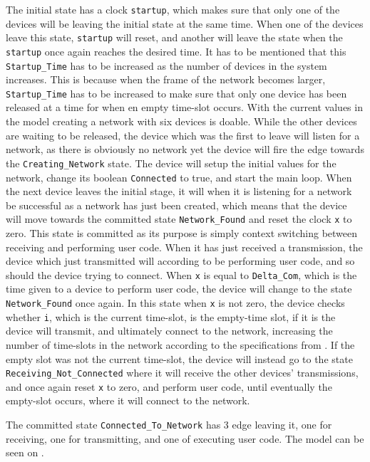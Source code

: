 The initial state has a clock \texttt{startup}, which makes sure that only one of the devices will be leaving the initial state at the same time.
When one of the devices leave this state, \texttt{startup} will reset, and another will leave the state when the \texttt{startup} once again reaches the desired time.
It has to be mentioned that this \texttt{Startup\_Time} has to be increased as the number of devices in the system increases.
This is because when the frame of the network becomes larger, \texttt{Startup\_Time} has to be increased to make sure that only one device has been released at a time for when en empty time-slot occurs.
With the current values in the model creating a network with six devices is doable.
While the other devices are waiting to be released, the device which was the first to leave will listen for a network, as there is obviously no network yet the device will fire the edge towards the \texttt{Creating\_Network} state.
The device will setup the initial values for the network, change its boolean \texttt{Connected} to true, and start the main loop.
When the next device leaves the initial stage, it will when it is listening for a network be successful as a network has just been created, which means that the device will move towards the committed state \texttt{Network\_Found} and reset the clock \texttt{x} to zero.
This state is committed as its purpose is simply context switching between receiving and performing user code.
When it has just received a transmission, the device which just transmitted will according to  be performing user code, and so should the device trying to connect.
When \texttt{x} is equal to \texttt{Delta\_Com}, which is the time given to a device to perform user code, the device will change to the state \texttt{Network\_Found} once again.
In this state when \texttt{x} is not zero, the device checks whether \texttt{i}, which is the current time-slot, is the empty-time slot, if it is the device will transmit, and ultimately connect to the network, increasing the number of time-slots in the network according to the specifications from .
If the empty slot was not the current time-slot, the device will instead go to the state \texttt{Receiving\_Not\_Connected} where it will receive the other devices' transmissions, and once again reset \texttt{x} to zero, and perform user code, until eventually the empty-slot occurs, where it will connect to the network.

The committed state \texttt{Connected\_To\_Network} has 3 edge leaving it, one for receiving, one for transmitting, and one of executing user code.
The model can be seen on .

